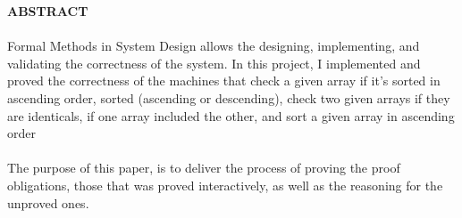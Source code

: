 \begin{center}
\thispagestyle{empty}
\vspace{2cm}
\LARGE{\textbf{ABSTRACT}}\\[1.0cm]
\end{center}
\thispagestyle{empty}
\large{\paragraph{}
Formal Methods in System Design allows the designing, implementing, and validating the correctness of the system. In this project, I implemented and proved the correctness of the machines that check a given array if it's sorted in ascending order, sorted (ascending or descending), check two given arrays if they are identicals, if one array included the other, and sort a given array in ascending order
}
\paragraph{}
The purpose of this paper, is to deliver the process of proving the proof obligations, those that was proved interactively, as well as the reasoning for the unproved ones.